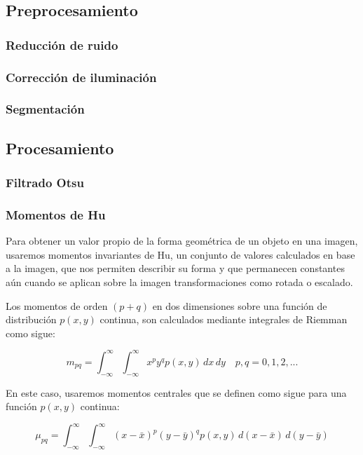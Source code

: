 \documentclass[letter]{article}
\begin{document}
\subsection{Preprocesamiento}
\label{sec:org202d791}

\subsubsection{Reducción de ruido}
\label{sec:orgfefde72}
\subsubsection{Corrección de iluminación}
\label{sec:orgf47058c}

\subsubsection{Segmentación}
\label{sec:org63baf2d}

\subsection{Procesamiento}
\label{sec:org7324bac}
\subsubsection{Filtrado Otsu}
\label{sec:orgb639d9d}
\subsubsection{Momentos de Hu}
\label{sec:orgdbac3c5}
Para obtener un valor propio de la forma geométrica de un objeto en una imagen,
usaremos momentos invariantes de Hu, un conjunto de valores calculados en base a
la imagen, que nos permiten describir su forma y que permanecen constantes aún
cuando se aplican sobre la imagen transformaciones como rotada o escalado.

Los momentos de orden \((p+q)\) en dos dimensiones sobre una función de
distribución \(p(x, y)\) continua, son calculados mediante integrales de Riemman
como sigue:

$$
m_{pq} =  \int_{-\infty}^{\infty} \int_{-\infty}^{\infty} x^p y^q p(x, y)\,dx\,dy \quad p, q = 0, 1, 2, ...
$$

En este caso, usaremos momentos centrales que se definen como sigue para una
función \(p(x, y)\) continua:

$$ \mu_{pq} = \int_{-\infty}^{\infty} \int_{-\infty}^{\infty} (x-\bar x)^p (y-\bar y)^q p(x, y)\, d(x-\bar x)\,d(y-\bar y) $$
\end{document}
